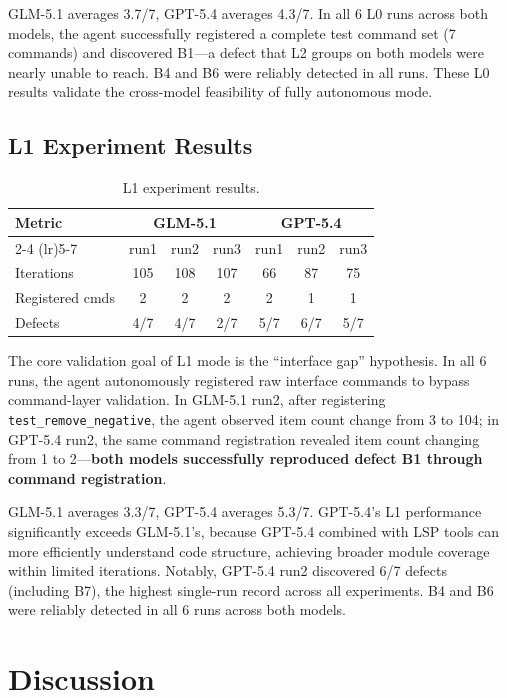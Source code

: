 \documentclass[sigconf,nonacm]{acmart}
\begin{document}
GLM-5.1 averages 3.7/7, GPT-5.4 averages 4.3/7. In all 6 L0 runs across both models, the agent successfully registered a complete test command set (7 commands) and discovered B1---a defect that L2 groups on both models were nearly unable to reach. B4 and B6 were reliably detected in all runs. These L0 results validate the cross-model feasibility of fully autonomous mode.

\subsection{L1 Experiment Results}

\begin{table}[htbp]
\caption{L1 experiment results.}
\label{tab:l1}
\small
\begin{tabular}{lcccccc}
\toprule
Metric & \multicolumn{3}{c}{GLM-5.1} & \multicolumn{3}{c}{GPT-5.4} \\
\cmidrule(lr){2-4} \cmidrule(lr){5-7}
 & run1 & run2 & run3 & run1 & run2 & run3 \\
\midrule
Iterations & 105 & 108 & 107 & 66 & 87 & 75 \\
Registered cmds & 2 & 2 & 2 & 2 & 1 & 1 \\
Defects & 4/7 & 4/7 & 2/7 & 5/7 & 6/7 & 5/7 \\
\bottomrule
\end{tabular}
\end{table}

The core validation goal of L1 mode is the ``interface gap'' hypothesis. In all 6 runs, the agent autonomously registered raw interface commands to bypass command-layer validation. In GLM-5.1 run2, after registering \texttt{test\_remove\_negative}, the agent observed item count change from 3 to 104; in GPT-5.4 run2, the same command registration revealed item count changing from 1 to 2---\textbf{both models successfully reproduced defect B1 through command registration}.

GLM-5.1 averages 3.3/7, GPT-5.4 averages 5.3/7. GPT-5.4's L1 performance significantly exceeds GLM-5.1's, because GPT-5.4 combined with LSP tools can more efficiently understand code structure, achieving broader module coverage within limited iterations. Notably, GPT-5.4 run2 discovered 6/7 defects (including B7), the highest single-run record across all experiments. B4 and B6 were reliably detected in all 6 runs across both models.

\section{Discussion}
\end{document}
